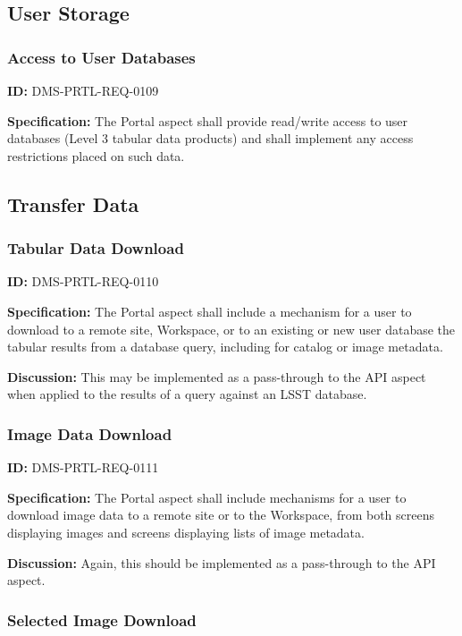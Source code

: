 \documentclass[SE,toc]{lsstdoc}
\begin{document}
\subsection{User Storage}

\subsubsection{Access to User Databases}

\label{DMS-PRTL-REQ-0109}
\textbf{ID:} DMS-PRTL-REQ-0109

\textbf{Specification:}
The Portal aspect shall provide read/write access to user databases (Level 3 tabular data products) and shall implement any access restrictions placed on such data.

\subsection{Transfer Data}

\subsubsection{Tabular Data Download}

\label{DMS-PRTL-REQ-0110}
\textbf{ID:} DMS-PRTL-REQ-0110

\textbf{Specification:}
The Portal aspect shall include a mechanism for a user to download to a remote site, Workspace, or to an existing or new user database the tabular results from a database query, including for catalog or image metadata.

\textbf{Discussion:}
This may be implemented as a pass-through to the API aspect when applied to the results of a query against an LSST database.

\subsubsection{Image Data Download}

\label{DMS-PRTL-REQ-0111}
\textbf{ID:} DMS-PRTL-REQ-0111

\textbf{Specification:}
The Portal aspect shall include mechanisms for a user to download image data to a remote site or to the Workspace, from both screens displaying images and screens displaying lists of image metadata.

\textbf{Discussion:}
Again, this should be implemented as a pass-through to the API aspect.

\subsubsection{Selected Image Download}
\end{document}
